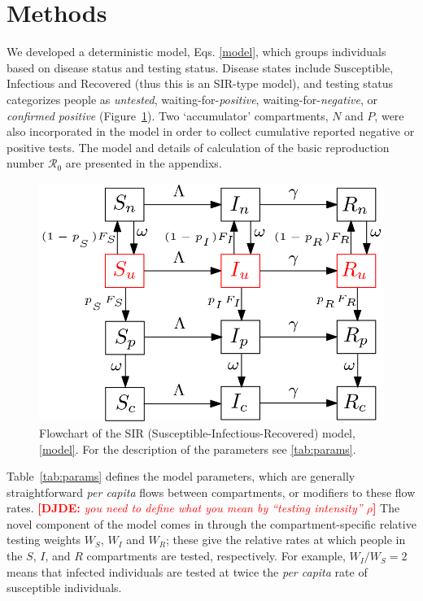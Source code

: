 \documentclass[12pt]{article}
\newcommand{\percap}{\emph{per capita}\xspace}
\newcommand{\Rnum}{\mathcal{R}_0}
\newcommand{\comment}{\showcomment}
\newcommand{\showcomment}[3]{\textcolor{#1}{\textbf{[#2: }\textsl{#3}\textbf{]}}}
\newcommand{\david}[1]{\comment{red}{DJDE}{#1}}
\theoremstyle{definition} %
\begin{document}
\section{Methods}

We developed a deterministic model, Eqs. \eqref{model}, which groups individuals based on disease status and testing status. Disease states include Susceptible, Infectious and Recovered (thus this is an SIR-type model), and testing status categorizes people as \emph{untested}, waiting-for-\emph{positive}, waiting-for-\emph{negative}, or \emph{confirmed positive} (Figure~\ref{fig:flowchart}). Two `accumulator' compartments, $N$ and $P$, were also incorporated in the model in order to collect cumulative reported negative or positive tests. The model and details of calculation of the basic reproduction number $\Rnum$ are presented in the appendixs.

\begin{figure}[!h] 
\begin{center} 
\includegraphics[scale=0.3]{./pix/sir_comp.png}
\caption{\small Flowchart of the SIR (Susceptible-Infectious-Recovered) model, \ref{model}. For the description of the parameters see \cref{tab:params}.
\label{fig:flowchart}}
\end{center} 
\end{figure}

Table~\ref{tab:params} defines the model parameters, which are generally straightforward
\percap flows between compartments, or modifiers to these flow rates.
\david{you need to define what you mean by ``testing intensity'' $\rho$}
The novel component of the model comes in through the compartment-specific relative testing weights $W_S$, $W_I$ and $W_R$; these give the relative rates at which people in the $S$, $I$, and $R$ compartments are tested, respectively. For example, $W_I/W_S=2$ means that infected individuals are tested at twice the \percap rate of susceptible individuals. 
\end{document}
